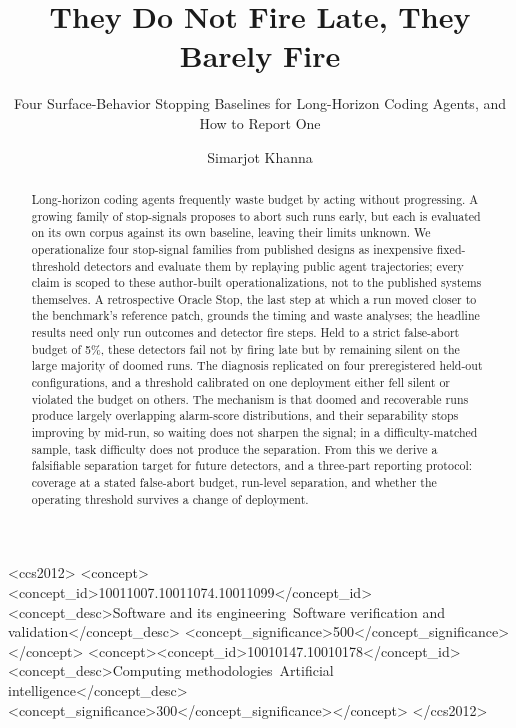\documentclass[sigconf,screen]{acmart}
\begin{document}
\title{They Do Not Fire Late, They Barely Fire}
\subtitle{Four Surface-Behavior Stopping Baselines for Long-Horizon Coding Agents,
and How to Report One}
\author{Simarjot Khanna}

\begin{abstract}
Long-horizon coding agents frequently waste budget by acting without progressing. A growing family
of stop-signals proposes to abort such runs early, but each is evaluated on its own corpus against
its own baseline, leaving their limits unknown. We operationalize four stop-signal families from
published designs as inexpensive fixed-threshold detectors and evaluate them by replaying public
agent trajectories; every claim is scoped to these author-built operationalizations, not to the
published systems themselves. A retrospective Oracle Stop, the last step at which a run moved
closer to the benchmark's reference patch, grounds the timing and waste analyses; the headline
results need only run outcomes and detector fire steps. Held to a strict false-abort budget of
5\%, these detectors fail not by firing late but by remaining silent on the large majority of
doomed runs. The diagnosis replicated on four preregistered held-out configurations, and a
threshold calibrated on one deployment either fell silent or violated the budget on others. The
mechanism is that doomed and recoverable runs produce largely overlapping alarm-score
distributions, and their separability stops improving by mid-run, so waiting does not sharpen the
signal; in a difficulty-matched sample, task difficulty does not produce the separation. From this
we derive a falsifiable separation target for future detectors, and a three-part reporting
protocol: coverage at a stated false-abort budget, run-level separation, and whether the operating
threshold survives a change of deployment.
\end{abstract}

\begin{CCSXML}
<ccs2012>
<concept><concept_id>10011007.10011074.10011099</concept_id>
<concept_desc>Software and its engineering~Software verification and validation</concept_desc>
<concept_significance>500</concept_significance></concept>
<concept><concept_id>10010147.10010178</concept_id>
<concept_desc>Computing methodologies~Artificial intelligence</concept_desc>
<concept_significance>300</concept_significance></concept>
</ccs2012>
\end{CCSXML}
\end{document}
